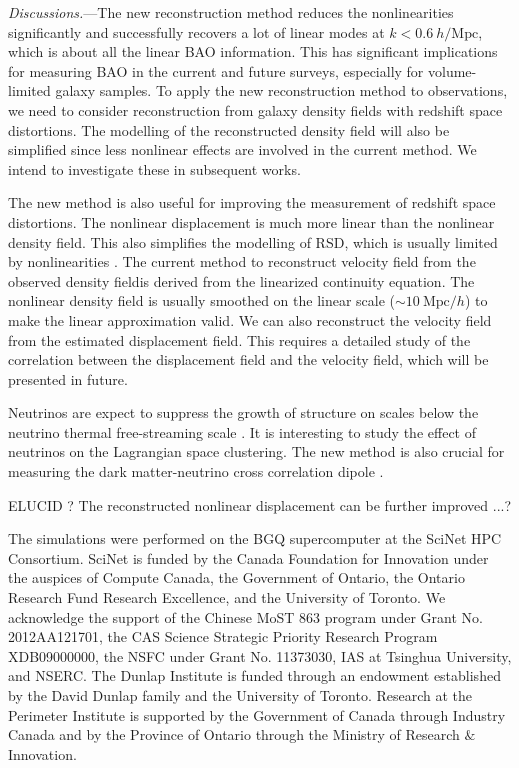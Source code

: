 \documentclass[aps,prd,twocolumn,superscriptaddress,groupedaddress,nofootinbib]{revtex4}  %
\newcommand{\mr}{\mathrm}
\begin{document}
{\it Discussions.}---The new reconstruction method reduces the nonlinearities 
significantly and successfully recovers a lot of linear modes 
at $k<0.6\ h/\mr{Mpc}$, which is about all the linear BAO information.
This has significant implications for measuring BAO in the current and future 
surveys, especially for volume-limited galaxy samples. 
To apply the new reconstruction method to observations, we need to consider 
reconstruction from galaxy density fields with redshift space distortions.
The modelling of the reconstructed density field will also be simplified since
less nonlinear effects are involved in the current method.
We intend to investigate these in subsequent works. 

The new method is also useful for improving the measurement of redshift space
distortions. The nonlinear displacement is much more linear than
the nonlinear density field. 
This also simplifies the modelling of RSD, which is usually
limited by nonlinearities \cite{2013PhRvD..87f3526Z}.
The current method to reconstruct velocity field from the observed density 
fieldis derived from the linearized continuity equation. 
The nonlinear density field is usually smoothed on the linear scale
($\sim10\ \mr{Mpc}/h$) to make the linear approximation valid.
We can also reconstruct the velocity field from the estimated displacement 
field.
This requires a detailed study of the correlation between the displacement 
field and the velocity field, which will be presented in future.

Neutrinos are expect to suppress the growth of structure on scales below the 
neutrino thermal free-streaming scale \cite{1980bond,1997hu}.
It is interesting to study the effect of neutrinos on the Lagrangian space 
clustering. 
The new method is also crucial for measuring the dark matter-neutrino cross 
correlation dipole \cite{2014zhm,2016zhm}. 


ELUCID \cite{2014ApJ...794...94W}?
The reconstructed nonlinear displacement can be further improved ...?


The simulations were performed on the BGQ supercomputer at the SciNet HPC 
Consortium. SciNet is funded by the Canada Foundation for Innovation under 
the auspices of Compute Canada, the Government of Ontario, the Ontario Research 
Fund Research Excellence, and the University of Toronto.
We acknowledge the support of the Chinese MoST 863 program under Grant 
No. 2012AA121701, the CAS Science Strategic Priority Research Program 
XDB09000000, the NSFC under Grant No. 11373030, IAS at Tsinghua University, 
 and NSERC.
The Dunlap Institute is funded through an endowment established by the David Dunlap family and the University of Toronto.
Research at the Perimeter Institute is supported by the Government of Canada
through Industry Canada and by the Province of Ontario through the Ministry of
Research $\&$ Innovation.



\end{document}
